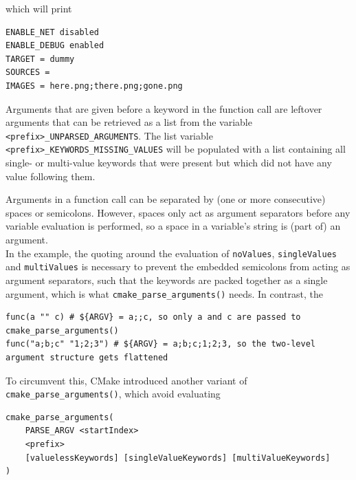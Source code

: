 \documentclass[table, xcdraw]{article}%
\begin{document}
which will print

\begin{verbatim}
ENABLE_NET disabled
ENABLE_DEBUG enabled
TARGET = dummy
SOURCES =
IMAGES = here.png;there.png;gone.png
\end{verbatim}

Arguments that are given before a keyword in the function call are leftover arguments that can be retrieved as a list from the variable \texttt{<prefix>_UNPARSED_ARGUMENTS}. The list variable \texttt{<prefix>_KEYWORDS_MISSING_VALUES} will be populated with a list containing all single- or multi-value keywords that were present but which did not have any value following them.

Arguments in a function call can be separated by (one or more consecutive) spaces or semicolons. However, spaces only act as argument separators before any variable evaluation is performed, so a space in a variable's string is (part of) an argument.\\
In the example, the quoting around the evaluation of \texttt{noValues}, \texttt{singleValues} and \texttt{multiValues} is necessary to prevent the embedded semicolons from acting as argument separators, such that the keywords are packed together as a single argument, which is what \texttt{cmake_parse_arguments()} needs. In contrast, the %

\begin{verbatim}
func(a "" c) # ${ARGV} = a;;c, so only a and c are passed to cmake_parse_arguments()
func("a;b;c" "1;2;3") # ${ARGV} = a;b;c;1;2;3, so the two-level argument structure gets flattened
\end{verbatim}

To circumvent this, CMake introduced another variant of \texttt{cmake_parse_arguments()}, which avoid evaluating

\begin{verbatim}
cmake_parse_arguments(
    PARSE_ARGV <startIndex>
    <prefix>
    [valuelessKeywords] [singleValueKeywords] [multiValueKeywords]
)
\end{verbatim}
\end{document}
